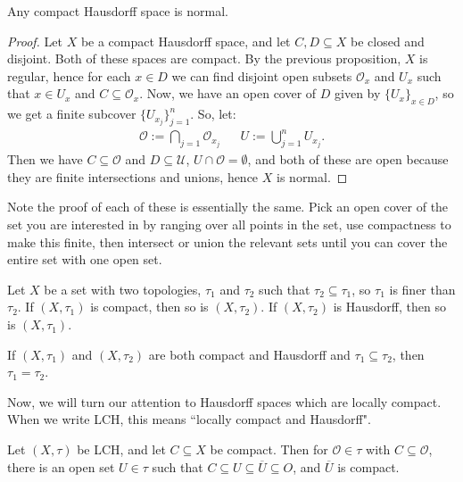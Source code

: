 	\begin{prop}
		Any compact Hausdorff space is normal.
	\end{prop}
	
	\begin{proof}
		Let $X$ be a compact Hausdorff space, and let $C, D\subseteq X$ be closed and disjoint. Both of these spaces 
		are compact. By the previous proposition, $X$ is regular, hence for each $x\in D$ we can find disjoint open 
		subsets $\mathcal O_x$ and $U_x$ such that $x\in U_x$ and $C\subseteq\mathcal O_x$. Now, we have an 
		open cover of $D$ given by $\{U_x\}_{x\in D}$, so we get a finite subcover $\{U_{x_j}\}_{j = 1}^n$. So, let:
		\begin{align}
			\mathcal O :=\bigcap_{j = 1}\mathcal O_{x_j} && U := \bigcup_{j = 1}^n U_{x_j}.
		\end{align}
		Then we have $C\subseteq\mathcal O$ and $D\subseteq\mathcal U$, $U\cap\mathcal O = \emptyset$, and both 
		of these are open because they are finite intersections and unions, hence $X$ is normal.
	\end{proof}
	
	Note the proof of each of these is essentially the same. Pick an open cover of the set you are interested in by ranging 
	over all points in the set, use compactness to make this finite, then intersect or union the relevant sets until you 
	can cover the entire set with one open set.
	
	\begin{prop}
		Let $X$ be a set with two topologies, $\tau_1$ and $\tau_2$ such that $\tau_2\subseteq\tau_1$, so $\tau_1$ is 
		finer than $\tau_2$. If $(X, \tau_1)$ is compact, then so is $(X, \tau_2)$. If $(X, \tau_2)$ is Hausdorff, then so 
		is $(X, \tau_1)$. 
	\end{prop}
	
	\begin{prop}
		If $(X, \tau_1)$ and $(X, \tau_2)$ are both compact and Hausdorff and $\tau_1\subseteq \tau_2$, then $\tau_1 = 
		\tau_2$. 
	\end{prop}
	
	Now, we will turn our attention to Hausdorff spaces which are locally compact. When we write LCH, this means ``locally 
	compact and Hausdorff". 
	
	\begin{prop}
		Let $(X, \tau)$ be LCH, and let $C\subseteq X$ be compact. Then for $\mathcal O\in\tau$ with $C\subseteq
		\mathcal O$, there is an open set $U\in\tau$ such that $C\subseteq U\subseteq \overline U\subseteq O$, and 
		$\overline U$ is compact. 
	\end{prop}
	
